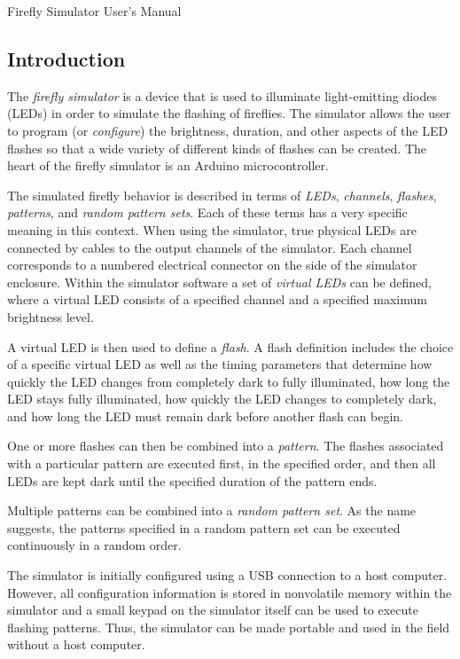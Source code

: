 \documentclass[letterpaper,11pt]{article}
\begin{document}
\Large
\centerline{Firefly Simulator User's Manual}
\normalsize
\subsection*{Introduction}

The \textit{firefly simulator} is a device that is used to illuminate
light-emitting diodes (LEDs) in order to simulate the flashing of fireflies.
The simulator allows the user to program (or \textit{configure}) the
brightness, duration, and other aspects of the LED flashes so that a wide
variety of different kinds of flashes can be created. The heart of the firefly
simulator is an Arduino microcontroller.

The simulated firefly behavior is described in terms of \textit{LEDs},
\textit{channels}, \textit{flashes}, \textit{patterns}, and \textit{random
pattern sets}. Each of these terms
has a very specific meaning in this context. When using the simulator, true
physical LEDs are connected by cables to the output channels of the simulator.
Each channel corresponds to a numbered electrical connector on the side of
the simulator enclosure. Within the simulator software a set of
\textit{virtual LEDs} can be defined, where a virtual LED consists of a
specified channel and a specified maximum brightness level.

A virtual LED is then used to define a \textit{flash}. A flash definition
includes the choice of a specific virtual LED as well as the timing parameters
that determine how quickly the LED changes from completely dark to fully
illuminated, how long the LED stays fully illuminated, how quickly the LED
changes to completely dark, and how long the LED must remain dark before
another flash can begin.

One or more flashes can then be combined into a \textit{pattern}. The flashes
associated with a particular pattern are executed first, in the specified
order, and then all LEDs are kept dark until the specified duration of the
pattern ends. 

Multiple patterns can be combined into a \textit{random pattern set}. As the
name suggests, the patterns specified in a random pattern set can be executed
continuously in a random order.

The simulator is initially configured using a USB connection to a host
computer. However, all configuration information is stored in nonvolatile
memory within the simulator and a small keypad on the simulator itself can
be used to execute flashing patterns. Thus, the simulator can be made portable
and used in the field without a host computer.
\end{document}
